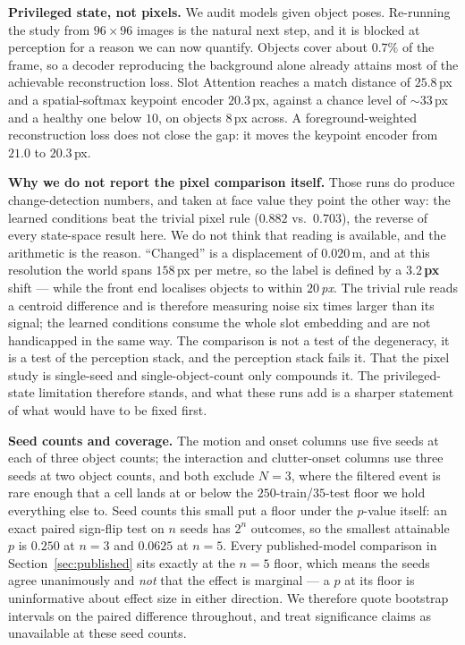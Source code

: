 \documentclass{article}
\begin{document}
\textbf{Privileged state, not pixels.} We audit models given object poses. Re-running the study
from $96\times96$ images is the natural next step, and it is blocked at perception for a reason
we can now quantify. Objects cover about $0.7\%$ of the frame, so a decoder reproducing the
background alone already attains most of the achievable reconstruction loss. Slot Attention
\citep{locatello2020slot} reaches a match distance of $25.8$\,px and a spatial-softmax keypoint
encoder \citep{finn2016spatial} $20.3$\,px, against a chance level of $\sim$$33$\,px and a
healthy one below $10$, on objects $8$\,px across. A foreground-weighted reconstruction loss
does not close the gap: it moves the keypoint encoder from $21.0$ to $20.3$\,px.

\textbf{Why we do not report the pixel comparison itself.} Those runs do produce
change-detection numbers, and taken at face value they point the other way: the learned
conditions beat the trivial pixel rule ($0.882$ vs.\ $0.703$), the reverse of every
state-space result here. We do not think that reading is available, and the arithmetic is the
reason. ``Changed'' is a displacement of $0.020$\,m, and at this resolution the world spans
$158$\,px per metre, so the label is defined by a \textbf{$3.2$\,px} shift --- while the front
end localises objects to within \emph{$20$\,px}. The trivial rule reads a centroid difference
and is therefore measuring noise six times larger than its signal; the learned conditions
consume the whole slot embedding and are not handicapped in the same way. The comparison is not
a test of the degeneracy, it is a test of the perception stack, and the perception stack fails
it. That the pixel study is single-seed and single-object-count only compounds it. The
privileged-state limitation therefore stands, and what these runs add is a sharper statement of
what would have to be fixed first.

\textbf{Seed counts and coverage.} The motion and onset columns use five seeds at each of
three object counts; the interaction and clutter-onset columns use three seeds at two object
counts, and both exclude $N=3$, where the filtered event is rare enough that a cell lands at or
below the $250$-train/$35$-test floor we hold everything else to. Seed counts this small put a floor
under the $p$-value itself: an exact paired sign-flip test on $n$ seeds has $2^n$ outcomes, so
the smallest attainable $p$ is $0.250$ at $n=3$ and $0.0625$ at $n=5$. Every published-model
comparison in Section~\ref{sec:published} sits exactly at the $n=5$ floor, which means the
seeds agree unanimously and \emph{not} that the effect is marginal --- a $p$ at its floor is
uninformative about effect size in either direction. We therefore quote bootstrap intervals on
the paired difference throughout, and treat significance claims as unavailable at these seed
counts.
\end{document}
